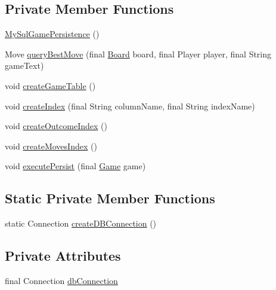 \subsection*{Private Member Functions}
\begin{DoxyCompactItemize}
\item 
\mbox{\hyperlink{classcom_1_1chess_1_1pgn_1_1_my_sql_game_persistence_a14f78ef2805a49000da78a79d77cf473}{My\+Sql\+Game\+Persistence}} ()
\item 
Move \mbox{\hyperlink{classcom_1_1chess_1_1pgn_1_1_my_sql_game_persistence_aa0eb23b80e56b47f74ace023101276af}{query\+Best\+Move}} (final \mbox{\hyperlink{classcom_1_1chess_1_1engine_1_1classic_1_1board_1_1_board}{Board}} board, final Player player, final String game\+Text)
\item 
void \mbox{\hyperlink{classcom_1_1chess_1_1pgn_1_1_my_sql_game_persistence_a0da894bb713f835ea2972a7b022c7254}{create\+Game\+Table}} ()
\item 
void \mbox{\hyperlink{classcom_1_1chess_1_1pgn_1_1_my_sql_game_persistence_a6a1b5245ef86397388d5d5a1affed3cc}{create\+Index}} (final String column\+Name, final String index\+Name)
\item 
void \mbox{\hyperlink{classcom_1_1chess_1_1pgn_1_1_my_sql_game_persistence_a3960f9f55641667b981fb2a7018edcbf}{create\+Outcome\+Index}} ()
\item 
void \mbox{\hyperlink{classcom_1_1chess_1_1pgn_1_1_my_sql_game_persistence_a664a6c22af5ddebda42b1e9b0ab70e55}{create\+Moves\+Index}} ()
\item 
void \mbox{\hyperlink{classcom_1_1chess_1_1pgn_1_1_my_sql_game_persistence_a255fc537c379fac0a8a8155ed624714d}{execute\+Persist}} (final \mbox{\hyperlink{classcom_1_1chess_1_1pgn_1_1_game}{Game}} game)
\end{DoxyCompactItemize}
\subsection*{Static Private Member Functions}
\begin{DoxyCompactItemize}
\item 
static Connection \mbox{\hyperlink{classcom_1_1chess_1_1pgn_1_1_my_sql_game_persistence_ab2811815b3e6d6c969555d1a9eac1c30}{create\+D\+B\+Connection}} ()
\end{DoxyCompactItemize}
\subsection*{Private Attributes}
\begin{DoxyCompactItemize}
\item 
final Connection \mbox{\hyperlink{classcom_1_1chess_1_1pgn_1_1_my_sql_game_persistence_a8a24839d8077329900ec5443b493d88f}{db\+Connection}}
\end{DoxyCompactItemize}
